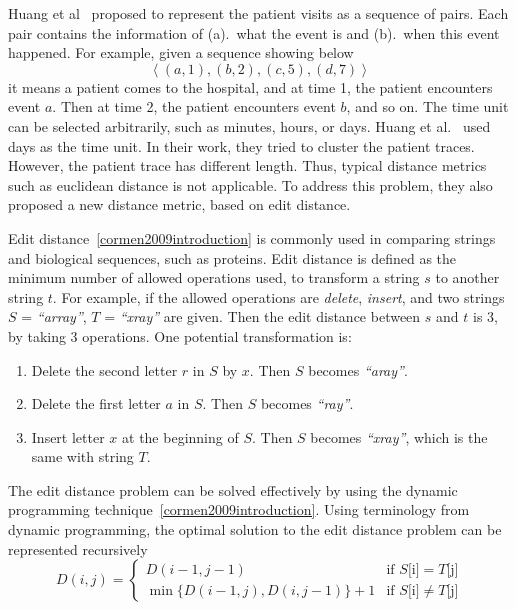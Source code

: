 Huang et al~\cite{huang2012anomaly} proposed to represent the patient visits as a sequence of pairs. Each pair contains the information of (a).~what the event is and (b).~when this event happened. For example, given a sequence showing below
$$
\left\langle(a, 1), (b, 2), (c, 5), (d, 7)\right\rangle 
$$
it means a patient comes to the hospital, and at time 1, the patient encounters event $a$. Then at time 2, the patient encounters event $b$, and so on. The time unit can be selected arbitrarily, such as minutes, hours, or days. Huang et al.~\cite{huang2012anomaly} used days as the time unit. In their work, they tried to cluster the patient traces. However, the patient trace has different length. Thus, typical distance metrics such as euclidean distance is not applicable. To address this problem, they also proposed a new distance metric, based on edit distance.

Edit distance~\ref{cormen2009introduction} is commonly used in comparing strings and biological sequences, such as proteins. Edit distance is defined as the minimum number of allowed operations used, to transform a string $s$ to another string $t$. For example, if the allowed operations are \textit{delete}, \textit{insert}, and two strings $S$ = \textit{``array''}, $T$ = \textit{``xray''} are given. Then the edit distance between $s$ and $t$ is 3, by taking 3 operations. One potential transformation is: 
\begin{enumerate}
	\item Delete the second letter $r$ in $S$ by $x$. Then $S$ becomes \textit{``aray''}.
	\item Delete the first letter $a$ in $S$. Then $S$ becomes \textit{``ray''}.
	\item Insert letter $x$ at the beginning of $S$. Then $S$ becomes \textit{``xray''}, which is the same with string $T$.
\end{enumerate}

The edit distance problem can be solved effectively by using the dynamic programming technique~\ref{cormen2009introduction}. Using terminology from dynamic programming, the optimal solution to the edit distance problem can be represented recursively
\begin{equation*}
D(i, j) = \begin{cases} 
   D(i-1, j-1) & \text{if } S\text{[i]} = T\text{[j]} \\
   \min\{D(i-1, j), D(i, j-1)\} + 1       & \text{if } S\text{[i]} \neq T\text{[j]}
  \end{cases}
\end{equation*}

